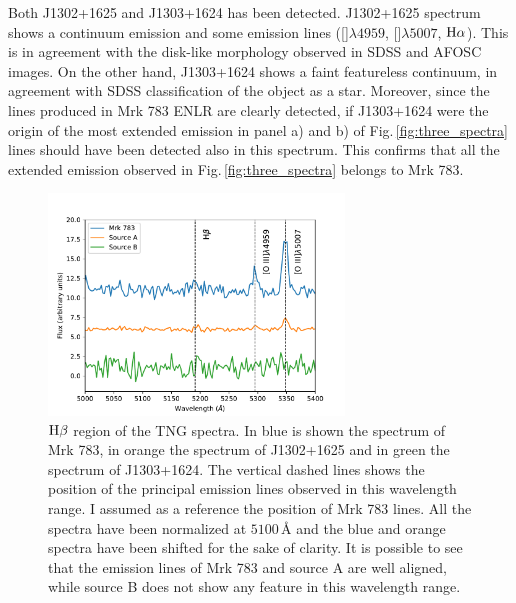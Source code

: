 \documentclass[../thesis.tex]{subfiles}
\begin{document}
Both J1302+1625 and J1303+1624 has been detected.
J1302+1625 spectrum shows a continuum emission and some emission lines ([]$\lambda4959$, []$\lambda5007$, $\rm H\alpha$).
This is in agreement with the disk-like morphology observed in SDSS and AFOSC images.
On the other hand, J1303+1624 shows a faint featureless continuum, in agreement with SDSS classification of the object as a star.
Moreover, since the lines produced in Mrk 783 ENLR are clearly detected, if J1303+1624 were the origin of the most extended emission in panel a) and b) of Fig.\,\ref{fig:three_spectra} lines should have been detected also in this spectrum.
This confirms that all the extended emission observed in Fig.\,\ref{fig:three_spectra} belongs to Mrk 783.

\begin{figure}
\centering
\includegraphics[width=0.7\textwidth]{images/paper3/companions_spec.pdf} 
\caption[]{$\rm H\beta$ region of the TNG spectra. In blue is shown the spectrum of Mrk 783, in orange the spectrum of J1302+1625 and in green the spectrum of J1303+1624. The vertical dashed lines shows the position of the principal emission lines observed in this wavelength range. I assumed as a reference the position of Mrk 783 lines. All the spectra have been normalized at $5100\,\si{\angstrom}$ and the blue and orange spectra have been shifted for the sake of clarity.
It is possible to see that the emission lines of Mrk 783 and source A are well aligned, while source B does not show any feature in this wavelength range.} 
\label{fig:companions_spec}
\end{figure} 
\end{document}
